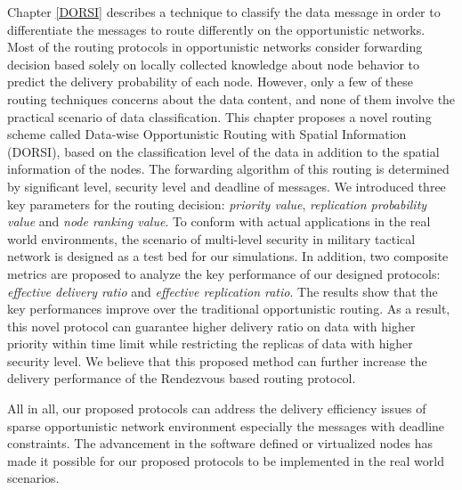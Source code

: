 Chapter \ref{DORSI} describes a technique to classify the data message in order to differentiate the messages to route differently on the opportunistic networks.
Most of the routing protocols in opportunistic networks consider forwarding decision based solely on locally collected knowledge about node behavior to predict the delivery probability of each node. 
However, only a few of these routing techniques concerns about the data content, and none of them involve the practical scenario of data classification. 
This chapter proposes a novel routing scheme called Data-wise Opportunistic Routing with Spatial Information (DORSI), based on the classification level of the data in addition to the spatial information of the nodes. 
The forwarding algorithm of this routing is determined by significant level, security level and deadline of messages. 
We introduced three key parameters for the routing decision: \emph{priority value}, \emph{replication probability value} and \emph{node ranking value}.
To conform with actual applications in the real world environments, the scenario of multi-level security in military tactical network is designed as a test bed for our simulations. 
In addition, two composite metrics are proposed to analyze the key performance of our designed protocols: \emph{effective delivery ratio} and \emph{effective replication ratio}.
The results show that the key performances improve over the traditional opportunistic routing. 
As a result, this novel protocol can guarantee higher delivery ratio on data with higher priority within time limit while restricting the replicas of data with higher security level.
We believe that this proposed method can further increase the delivery performance of the Rendezvous based routing protocol.

All in all, our proposed protocols can address the delivery efficiency issues of sparse opportunistic network environment especially the messages with deadline constraints.
The advancement in the software defined or virtualized nodes has made it possible for our proposed protocols to be implemented in the real world scenarios.












